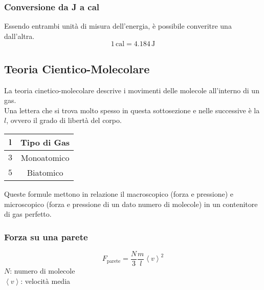 \subsubsection{Conversione da J a cal}
Essendo entrambi unità di misura dell'energia, è possibile converitre una dall'altra.
\begin{equation*}
1\,\text{cal} = 4.184\,\text{J}
\end{equation*}

\subsection{Teoria Cientico-Molecolare}
La teoria cinetico-molecolare descrive i movimenti delle molecole all'interno di un gas.\\
Una lettera che si trova molto spesso in questa sottosezione e nelle successive è la $l$, ovvero
il grado di libertà del corpo.\\
\begin{center}
	\begin{tabular}{c c}
		$\boldsymbol{l}$ & \textbf{Tipo di Gas}\\ \hline
		$3$ & Monoatomico \\ \hline
		$5$ & Biatomico\\
	\end{tabular}
\end{center}
Queste formule mettono in relazione il macroscopico (forza e pressione) e microscopico (forza e 
pressione di un dato numero di molecole) in un contenitore di gas perfetto.

\begin{center}
\end{center}

\subsubsection{Forza su una parete}
\begin{equation*}
F_{\text{parete}} = \frac{N}{3}\frac{m}{l}\left\langle v\right\rangle^2
\end{equation*}
$N$: numero di molecole\\
$\left\langle v\right\rangle$: velocità media

